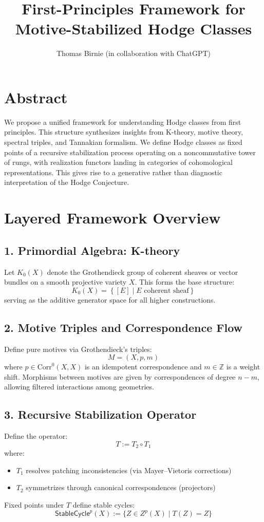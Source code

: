 \documentclass[12pt]{article}
\title{First-Principles Framework for Motive-Stabilized Hodge Classes}
\author{Thomas Birnie (in collaboration with ChatGPT)}
\date{}
\begin{document}
\maketitle

\section*{Abstract}
We propose a unified framework for understanding Hodge classes from first principles. This structure synthesizes insights from K-theory, motive theory, spectral triples, and Tannakian formalism. We define Hodge classes as fixed points of a recursive stabilization process operating on a noncommutative tower of rungs, with realization functors landing in categories of cohomological representations. This gives rise to a generative rather than diagnostic interpretation of the Hodge Conjecture.

\section{Layered Framework Overview}

\subsection*{1. Primordial Algebra: K-theory}
Let \( K_0(X) \) denote the Grothendieck group of coherent sheaves or vector bundles on a smooth projective variety \( X \). This forms the base structure:
\[
K_0(X) = \left\{ [E] \mid E \text{ coherent sheaf} \right\}
\]
serving as the additive generator space for all higher constructions.

\subsection*{2. Motive Triples and Correspondence Flow}
Define pure motives via Grothendieck's triples:
\[
M = (X, p, m)
\]
where \( p \in \text{Corr}^0(X, X) \) is an idempotent correspondence and \( m \in \mathbb{Z} \) is a weight shift. Morphisms between motives are given by correspondences of degree \( n - m \), allowing filtered interactions among geometries.

\subsection*{3. Recursive Stabilization Operator}
Define the operator:
\[
T := T_2 \circ T_1
\]
where:
\begin{itemize}
  \item \( T_1 \) resolves patching inconsistencies (via Mayer–Vietoris corrections)
  \item \( T_2 \) symmetrizes through canonical correspondences (projectors)
\end{itemize}
Fixed points under \( T \) define stable cycles:
\[
\mathsf{StableCycle}^p(X) := \{ Z \in Z^p(X) \mid T(Z) = Z \}
\]
\end{document}
